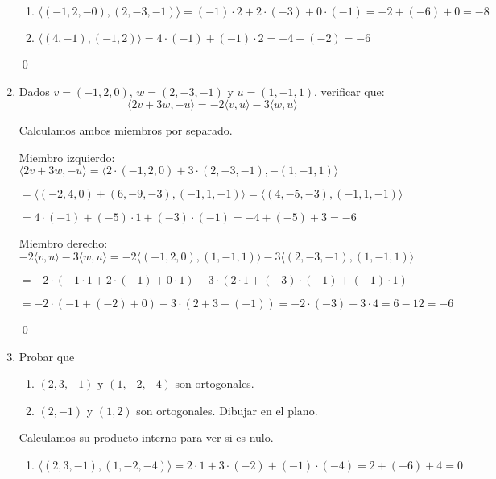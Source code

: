 \begin{enumerate}[topsep=6pt, itemsep=.4cm]
\rta

\begin{enumerate}
  \item $\langle (-1, 2, -0) ,(2,-3,-1) \rangle = (-1) \cdot 2 + 2 \cdot (-3) + 0 \cdot (-1) = -2 + (-6) + 0 = \boxed{-8}$ 
  \item  $\langle (4,-1),(-1,2) \rangle = 4 \cdot (-1) + (-1) \cdot 2 = -4 + (-2) = \boxed{-6}$
\end{enumerate}

\qed

\item Dados $v = (-1, 2,0)$, $w = (2,-3,-1)$  y $u = (1,-1,1)$, verificar que:
\begin{equation*}
	\langle 2v + 3w , -u   \rangle = -2\langle v ,u \rangle -3 \langle w , u  \rangle
\end{equation*}

\rta Calculamos ambos miembros por separado.


Miembro izquierdo: $\langle 2v + 3w , -u   \rangle = \langle 2 \cdot (-1, 2,0) + 3 \cdot (2,-3,-1) , -  (1,-1,1) \rangle $

$= \langle (-2, 4,0) + (6,-9,-3) , (-1,1,-1) \rangle = \langle (4,-5,-3) , (-1,1,-1) \rangle $

$= 4 \cdot (-1) + (-5) \cdot 1 + (-3) \cdot (-1) = -4 + (-5) + 3 = \boxed{-6}$

Miembro derecho: $-2\langle v ,u \rangle -3 \langle w , u  \rangle = -2 \langle (-1, 2,0) ,(1,-1,1) \rangle -3 \langle (2,-3,-1) , (1,-1,1)  \rangle $

$= -2 \cdot ( -1 \cdot 1 + 2 \cdot (-1) + 0 \cdot 1 ) - 3 \cdot ( 2 \cdot 1 + (-3) \cdot (-1) + (-1) \cdot 1 ) $

$= -2 \cdot ( -1 + (-2) + 0) - 3 \cdot ( 2 + 3 + (-1)) = -2 \cdot (-3) - 3 \cdot  4 = 6 - 12 = \boxed{-6} $

\qed

\item Probar  que 
\begin{enumerate}
	\item $(2,3,-1)$ y $(1, -2, -4)$ son ortogonales.
	\item $(2,-1)$ y $(1,2)$ son ortogonales. Dibujar en el plano. 
\end{enumerate}

\rta Calculamos su producto interno para ver si es nulo.

\begin{enumerate}
	\item $ \langle (2,3,-1) , (1, -2, -4) \rangle = 2 \cdot 1 + 3 \cdot (-2) + (-1) \cdot (-4) = 2 + (-6) + 4 = \boxed{0} $
	

\end{enumerate}
\end{enumerate}
